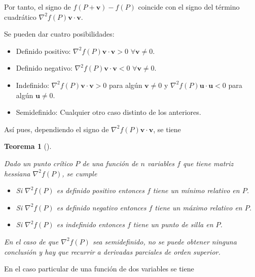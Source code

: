 \documentclass[
  a4paper,
]{scrreport}
\providecommand{\tightlist}{%
  \setlength{\itemsep}{0pt}\setlength{\parskip}{0pt}}\usepackage{longtable,booktabs,array}
\theoremstyle{definition}
\theoremstyle{definition}
\theoremstyle{definition}
\theoremstyle{plain}
\newtheorem{theorem}{Teorema}[chapter]
\theoremstyle{plain}
\theoremstyle{plain}
\theoremstyle{remark}
\begin{document}
Por tanto, el signo de \(f(P+\mathbf{v})-f(P)\) coincide con el signo
del término cuadrático \(\nabla^2f(P)\mathbf{v}\cdot\mathbf{v}\).

Se pueden dar cuatro posibilidades:

\begin{itemize}
\tightlist
\item
  Definido positivo: \(\nabla^2f(P)\mathbf{v}\cdot\mathbf{v}>0\)
  \(\forall \mathbf{v}\neq 0\).
\item
  Definido negativo: \(\nabla^2f(P)\mathbf{v}\cdot\mathbf{v}<0\)
  \(\forall \mathbf{v}\neq 0\).
\item
  Indefinido: \(\nabla^2f(P)\mathbf{v}\cdot\mathbf{v}>0\) para algún
  \(\mathbf{v}\neq 0\) y \(\nabla^2f(P)\mathbf{u}\cdot\mathbf{u}<0\)
  para algún \(\mathbf{u}\neq 0\).
\item
  Semidefinido: Cualquier otro caso distinto de los anteriores.
\end{itemize}

Así pues, dependiendo el signo de
\(\nabla^2f(P)\mathbf{v}\cdot\mathbf{v}\), se tiene

\begin{theorem}[]\protect\hypertarget{thm-extremos-funcion-varias-variables}{}\label{thm-extremos-funcion-varias-variables}

Dado un punto crítico \(P\) de una función de \(n\) variables \(f\) que
tiene matriz hessiana \(\nabla^2 f(P)\), se cumple

\begin{itemize}
\tightlist
\item
  Si \(\nabla^2f(P)\) es definido positivo entonces \(f\) tiene un
  \emph{mínimo relativo} en \(P\).
\item
  Si \(\nabla^2f(P)\) es definido negativo entonces \(f\) tiene un
  \emph{máximo relativo} en \(P\).
\item
  Si \(\nabla^2f(P)\) es indefinido entonces \(f\) tiene un \emph{punto
  de silla} en \(P\).
\end{itemize}

En el caso de que \(\nabla^2f(P)\) sea semidefinido, no se puede obtener
ninguna conclusión y hay que recurrir a derivadas parciales de orden
superior.

\end{theorem}

En el caso particular de una función de dos variables se tiene
\end{document}
